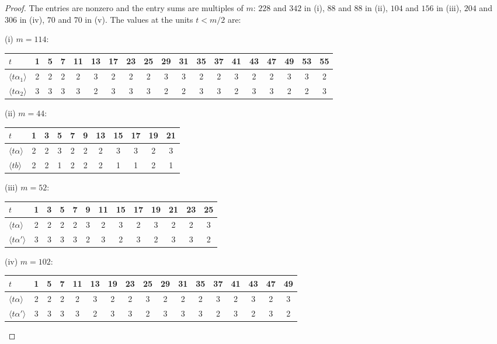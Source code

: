\begin{proof}
The entries are nonzero and the entry sums are multiples of $m$: $228$ and
$342$ in (i), $88$ and $88$ in (ii), $104$ and $156$ in (iii), $204$ and
$306$ in (iv), $70$ and $70$ in (v). The values at the units $t<m/2$ are:

\smallskip
\noindent(i) $m=114$:
\begin{center}
\small
\setlength{\tabcolsep}{3.2pt}
\begin{tabular}{l*{18}{c}}
\toprule
$t$ & 1 & 5 & 7 & 11 & 13 & 17 & 23 & 25 & 29 & 31 & 35 & 37 & 41 & 43 & 47 & 49 & 53 & 55\\
\midrule
$\langle t\alpha_{1}\rangle$ & 2&2&2&2&3&2&2&2&3&3&2&2&3&2&2&3&3&2\\
$\langle t\alpha_{2}\rangle$ & 3&3&3&3&2&3&3&3&2&2&3&3&2&3&3&2&2&3\\
\bottomrule
\end{tabular}
\end{center}
(ii) $m=44$:
\begin{center}
\small
\begin{tabular}{l*{10}{c}}
\toprule
$t$ & 1 & 3 & 5 & 7 & 9 & 13 & 15 & 17 & 19 & 21\\
\midrule
$\langle t\alpha\rangle$ & 2&2&3&2&2&2&3&3&2&3\\
$\langle tb\rangle$ & 2&2&1&2&2&2&1&1&2&1\\
\bottomrule
\end{tabular}
\end{center}
(iii) $m=52$:
\begin{center}
\small
\begin{tabular}{l*{12}{c}}
\toprule
$t$ & 1 & 3 & 5 & 7 & 9 & 11 & 15 & 17 & 19 & 21 & 23 & 25\\
\midrule
$\langle t\alpha\rangle$ & 2&2&2&2&3&2&3&2&3&2&2&3\\
$\langle t\alpha'\rangle$ & 3&3&3&3&2&3&2&3&2&3&3&2\\
\bottomrule
\end{tabular}
\end{center}
(iv) $m=102$:
\begin{center}
\small
\setlength{\tabcolsep}{4pt}
\begin{tabular}{l*{16}{c}}
\toprule
$t$ & 1 & 5 & 7 & 11 & 13 & 19 & 23 & 25 & 29 & 31 & 35 & 37 & 41 & 43 & 47 &
49\\
\midrule
$\langle t\alpha\rangle$ & 2&2&2&2&3&2&2&3&2&2&2&3&2&3&2&3\\
$\langle t\alpha'\rangle$ & 3&3&3&3&2&3&3&2&3&3&3&2&3&2&3&2\\

\end{tabular}
\end{center}
\end{proof}

